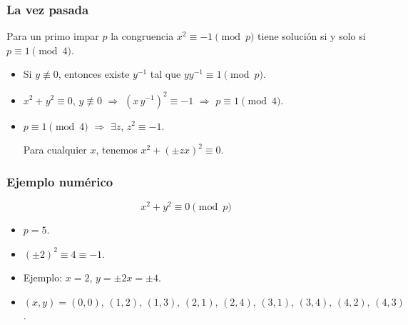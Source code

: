 \documentclass[handout]{beamer}
\begin{document}
\begin{frame}[fragile]
  \frametitle{La vez pasada}

  \begin{shaded}
    Para un primo impar $p$ la congruencia $x^2 \equiv -1 \pmod{p}$ tiene
    solución si y solo si $p \equiv 1 \pmod{4}$.
  \end{shaded}


  \vspace{\fill}

  \ifdefined\solutions

  \begin{itemize}
  \item<4-> Si $y \not\equiv 0$, entonces existe $y^{-1}$ tal que
    $y y^{-1} \equiv 1 \pmod{p}$.

  \item<5-> $x^2 + y^2 \equiv 0$, $y \not\equiv 0$ $\Longrightarrow$
    $(x\,y^{-1})^2 \equiv -1$ $\Longrightarrow$ $p \equiv 1 \pmod{4}$.

  \item<6-> $p \equiv 1 \pmod{4}$ $\Longrightarrow$ $\exists z$, $z^2 \equiv -1$.

    Para cualquier $x$, tenemos $x^2 + (\pm zx)^2 \equiv 0$.
  \end{itemize}
  \fi
\end{frame}


\begin{frame}[fragile]
  \frametitle{Ejemplo numérico}

  \[ x^2 + y^2 \equiv 0 \pmod{p} \]

  \begin{itemize}
  \item<2-> $p = 5$.

  \item<3-> $(\pm 2)^2 \equiv 4 \equiv -1$.

  \item<4-> Ejemplo: $x = 2$, $y = \pm 2 x = \pm 4$.

  \item<5-> $(x,y) = (0,0), \, (1,2), \, (1,3), \, (2,1), \, (2,4), \, (3, 1), \, (3, 4), \, (4, 2), \, (4, 3)$.
  \end{itemize}
\end{frame}
\end{document}
